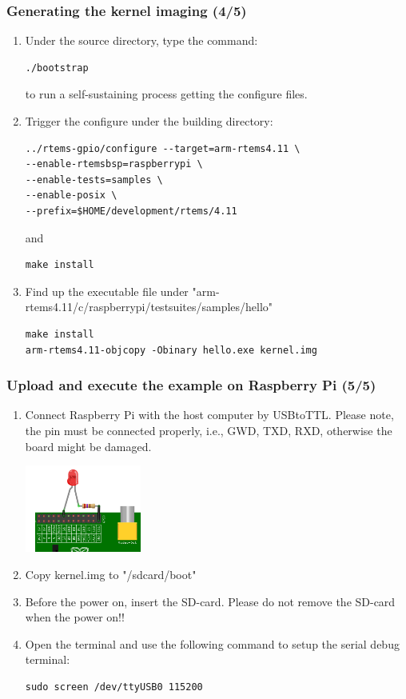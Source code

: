 \documentclass[t]{beamer}
\begin{document}
\begin{frame}[fragile]
\frametitle{Generating the kernel imaging (4/5)}
\begin{enumerate}
\item Under the source directory, type the command:
\begin{verbatim}
./bootstrap 
\end{verbatim}  
to run a self-sustaining process getting the configure files.
\item Trigger the configure under the building directory:
\begin{verbatim}
../rtems-gpio/configure --target=arm-rtems4.11 \
--enable-rtemsbsp=raspberrypi \
--enable-tests=samples \
--enable-posix \
--prefix=$HOME/development/rtems/4.11
\end{verbatim}   
and 
\begin{verbatim}
make install
\end{verbatim}   
\item Find up the executable file under "arm-rtems4.11/c/raspberrypi/testsuites/samples/hello"
\begin{verbatim}
make install
arm-rtems4.11-objcopy -Obinary hello.exe kernel.img
\end{verbatim}  
\end{enumerate}
\end{frame}
\begin{frame}[fragile]
\frametitle{Upload and execute the example on Raspberry Pi (5/5)}
\begin{enumerate}
\item Connect Raspberry Pi with the host computer by USBtoTTL. Please note, the pin must be connected properly, i.e., GWD, TXD, RXD, otherwise the board might be damaged.
\begin{center}
\includegraphics[width=0.3\textwidth]{figures/gpio-led}
\end{center}
\item Copy kernel.img to "/sdcard/boot"
\item Before the power on, insert the SD-card. Please do not remove the SD-card when the power on!!
\item Open the terminal and use the following command to setup the serial debug terminal:
\begin{verbatim}
sudo screen /dev/ttyUSB0 115200
\end{verbatim}   

\end{enumerate}
\end{frame}
\end{document}
